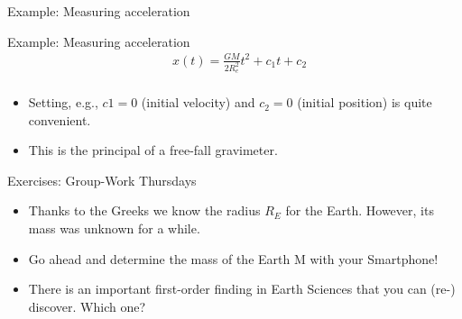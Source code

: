 \begin{frame}
    \begin{PointSix}{Example: Measuring acceleration}
    \end{PointSix}   
\end{frame}
\begin{frame}

  \begin{PointSix}{Example: Measuring acceleration}
       \begin{align*}
         & x(t) = \frac{GM}{2R_e^2}t^2+c_1t+c_2 \\
       \end{align*}
       \begin{itemize}
        \item Setting, e.g., $c1=0$ (initial velocity) and $c_2=0$ (initial position) is quite convenient.   
        \item This is the principal of a free-fall gravimeter.
      \end{itemize}
  \end{PointSix}
  
\end{frame}
\begin{frame}
  \begin{PointSix}{Exercises: Group-Work Thursdays}
    \begin{itemize}
      \item Thanks to the Greeks we know the radius $R_E$ for the Earth. However, its mass was unknown for a while.
      \item Go ahead and determine the mass of the Earth M with your Smartphone!
      \item \alert{There is an important first-order finding in Earth Sciences that you can (re-) discover. Which one?}
    \end{itemize}
      
  \end{PointSix}
\end{frame}

